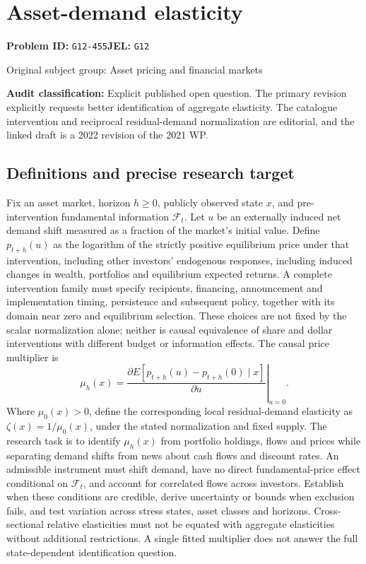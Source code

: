 \documentclass[11pt,a4paper]{article}
\begin{document}
\section*{Asset-demand elasticity}
\textbf{Problem ID:} \texttt{G12-455}\quad \textbf{JEL:} \texttt{G12}\par
\label{problem:OP-0312}
{\sffamily\small\color{muted}Original subject group: Asset pricing and financial markets\par}
\label{definitions:problem:30007594}
\textbf{Audit classification:} Explicit published open question. The primary revision explicitly requests better identification of aggregate elasticity. The catalogue intervention and reciprocal residual-demand normalization are editorial, and the linked draft is a 2022 revision of the 2021 WP.
\subsection*{Definitions and precise research target}
Fix an asset market, horizon \(h\geq0\), publicly observed state \(x\), and pre-intervention fundamental information \(\mathcal F_t\). Let \(u\) be an externally induced net demand shift measured as a fraction of the market's initial value. Define \(p_{t+h}(u)\) as the logarithm of the strictly positive equilibrium price under that intervention, including other investors' endogenous responses, including induced changes in wealth, portfolios and equilibrium expected returns. A complete intervention family must specify recipients, financing, announcement and implementation timing, persistence and subsequent policy, together with its domain near zero and equilibrium selection. These choices are not fixed by the scalar normalization alone; neither is causal equivalence of share and dollar interventions with different budget or information effects. The causal price multiplier is
\[\mu_h(x)=\left.\frac{\partial E[p_{t+h}(u)-p_{t+h}(0)\mid x]}{\partial u}\right|_{u=0}.\]
Where \(\mu_0(x)>0\), define the corresponding local residual-demand elasticity as \(\zeta(x)=1/\mu_0(x)\), under the stated normalization and fixed supply. The research task is to identify \(\mu_h(x)\) from portfolio holdings, flows and prices while separating demand shifts from news about cash flows and discount rates. An admissible instrument must shift demand, have no direct fundamental-price effect conditional on \(\mathcal F_t\), and account for correlated flows across investors. Establish when these conditions are credible, derive uncertainty or bounds when exclusion fails, and test variation across stress states, asset classes and horizons. Cross-sectional relative elasticities must not be equated with aggregate elasticities without additional restrictions. A single fitted multiplier does not answer the full state-dependent identification question.
\end{document}
